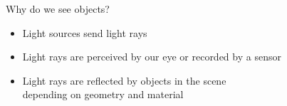\documentclass[utf8,stillsansserifmath,fleqn,t]{beamer}
\begin{document}
\begin{frame}
\frametitle{\insertsection}
Why do we see objects?
\begin{itemize}
\item<1-> Light sources send light rays
\item<2-> Light rays are perceived by our eye or recorded by a sensor
\item<3-> Light rays are reflected by objects in the scene\\
    depending on geometry and material
\end{itemize}
\vfill
{}
\vfill
{}
\end{frame}
\end{document}
